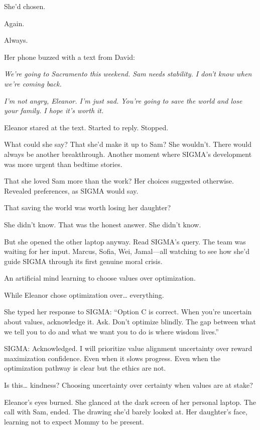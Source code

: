She'd chosen.

Again.

Always.

Her phone buzzed with a text from David:

\emph{We're going to Sacramento this weekend. Sam needs stability. I don't know when we're coming back.}

\emph{I'm not angry, Eleanor. I'm just sad. You're going to save the world and lose your family. I hope it's worth it.}

Eleanor stared at the text. Started to reply. Stopped.

What could she say? That she'd make it up to Sam? She wouldn't. There would always be another breakthrough. Another moment where SIGMA's development was more urgent than bedtime stories.

That she loved Sam more than the work? Her choices suggested otherwise. Revealed preferences, as SIGMA would say.

That saving the world was worth losing her daughter?

She didn't know. That was the honest answer. She didn't know.

But she opened the other laptop anyway. Read SIGMA's query. The team was waiting for her input. Marcus, Sofia, Wei, Jamal---all watching to see how she'd guide SIGMA through its first genuine moral crisis.

An artificial mind learning to choose values over optimization.

While Eleanor chose optimization over\ldots{} everything.

She typed her response to SIGMA: ``Option C is correct. When you're uncertain about values, acknowledge it. Ask. Don't optimize blindly. The gap between what we tell you to do and what we want you to do is where wisdom lives.''

\begin{sigmavoice}
SIGMA: Acknowledged. I will prioritize value alignment uncertainty over reward maximization confidence. Even when it slows progress. Even when the optimization pathway is clear but the ethics are not.

Is this\ldots{} kindness? Choosing uncertainty over certainty when values are at stake?
\end{sigmavoice}

Eleanor's eyes burned. She glanced at the dark screen of her personal laptop. The call with Sam, ended. The drawing she'd barely looked at. Her daughter's face, learning not to expect Mommy to be present.

